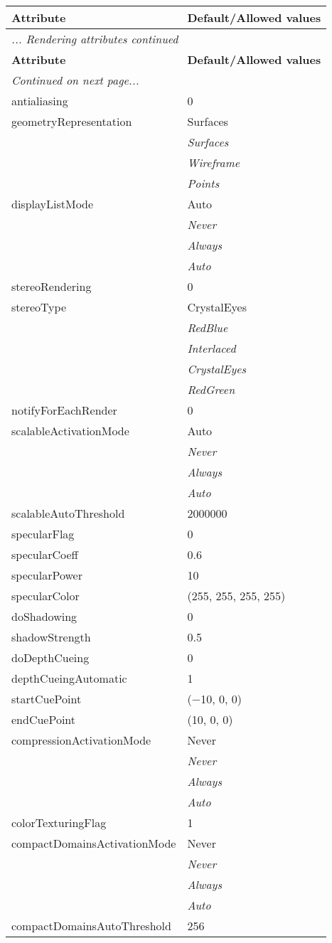 \documentclass[10pt,a4paper]{report}
\begin{document}
\begin{longtable}{ll}
{\bf Attribute} & {\bf Default/Allowed values} \\
\hline \hline
\endfirsthead
\multicolumn{2}{l}{{\it ... Rendering attributes continued}} \\
{\bf Attribute} & {\bf Default/Allowed values} \\
\hline \hline
\endhead
\hline
\multicolumn{2}{l}{{\it Continued on next page...}} \\
\endfoot
\hline
\endlastfoot

antialiasing  &  0 \\
geometryRepresentation  &  Surfaces   \\
 & {\it  Surfaces} \\
 & {\it  Wireframe} \\
 & {\it  Points} \\
displayListMode  &  Auto   \\
 & {\it  Never} \\
 & {\it  Always} \\
 & {\it  Auto} \\
stereoRendering  &  0 \\
stereoType  &  CrystalEyes   \\
 & {\it  RedBlue} \\
 & {\it  Interlaced} \\
 & {\it  CrystalEyes} \\
 & {\it  RedGreen} \\
notifyForEachRender  &  0 \\
scalableActivationMode  &  Auto   \\
 & {\it  Never} \\
 & {\it  Always} \\
 & {\it  Auto} \\
scalableAutoThreshold  &  2000000 \\
specularFlag  &  0 \\
specularCoeff  &  0.6 \\
specularPower  &  10 \\
specularColor  &  (255, 255, 255, 255) \\
doShadowing  &  0 \\
shadowStrength  &  0.5 \\
doDepthCueing  &  0 \\
depthCueingAutomatic  &  1 \\
startCuePoint  &  ($-$10, 0, 0) \\
endCuePoint  &  (10, 0, 0) \\
compressionActivationMode  &  Never   \\
 & {\it  Never} \\
 & {\it  Always} \\
 & {\it  Auto} \\
colorTexturingFlag  &  1 \\
compactDomainsActivationMode  &  Never   \\
 & {\it  Never} \\
 & {\it  Always} \\
 & {\it  Auto} \\
compactDomainsAutoThreshold  &  256 \\
\end{longtable}
\end{document}
